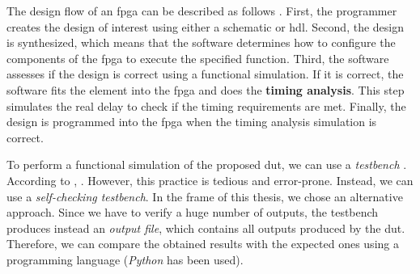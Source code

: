 The design flow of an \acrshort{fpga} can be described as follows \cite{barte_value-added_2011}. First, the programmer creates the design of interest using either a schematic or \acrshort{hdl}. Second, the design is synthesized, which means that the software determines how to configure the components of the \acrshort{fpga} to execute the specified function. Third, the software assesses if the design is correct using a functional simulation. If it is correct, the software fits the element into the \acrshort{fpga} and does the \textbf{timing analysis}. This step simulates the real delay to check if the timing requirements are met. Finally, the design is programmed into the \acrshort{fpga} when the timing analysis simulation is correct.

To perform a functional simulation of the proposed \acrfull{dut}, we can use a \textit{testbench} \cite{harris_digital_2015}. According to \textcite{harris_digital_2015}, . However, this practice is tedious and error-prone. Instead, we can use a \textit{self-checking testbench}. In the frame of this thesis, we chose an alternative approach. Since we have to verify a huge number of outputs, the testbench produces instead an \textit{output file}, which contains all outputs produced by the \acrshort{dut}. Therefore, we can compare the obtained results with the expected ones using a programming language (\textit{Python} has been used).